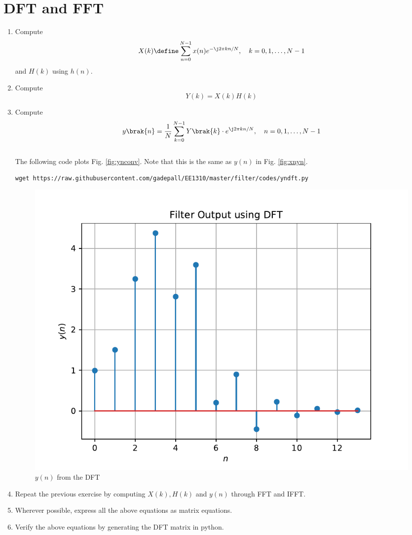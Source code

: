 \documentclass[journal,12pt,twocolumn]{IEEEtran}
\renewcommand\thesection{\arabic{section}}
\begin{document}
\section{DFT and FFT}
\begin{enumerate}[label=\thesection.\arabic*]
\item
Compute
\begin{equation}
X(k) \define \sum _{n=0}^{N-1}x(n) e^{-\j2\pi kn/N}, \quad k = 0,1,\dots, N-1
\end{equation}
and $H(k)$ using $h(n)$.
\item Compute 
\begin{equation}
Y(k) = X(k)H(k)
\end{equation}
\item Compute
\begin{equation}
 y\brak{n}={\frac {1}{N}}\sum _{k=0}^{N-1}Y\brak{k}\cdot e^{\j 2\pi kn/N},\quad n = 0,1,\dots, N-1
\end{equation}
\\
\solution The following code plots Fig. \ref{fig:ynconv}. Note that this is the same as 
$y(n)$ in  Fig. 
\ref{fig:xnyn}. 
%
\begin{lstlisting}
wget https://raw.githubusercontent.com/gadepall/EE1310/master/filter/codes/yndft.py
\end{lstlisting}
\begin{figure}[!ht]
\centering
\includegraphics[width=\columnwidth]{./figs/yndft}
\caption{$y(n)$ from the DFT}
\label{fig:yndft}
\end{figure}

\item Repeat the previous exercise by computing $X(k), H(k)$ and $y(n)$ through FFT and 
IFFT.
\item Wherever possible, express all the above equations as matrix equations.
\item Verify the above equations by generating the DFT matrix in python.
\end{enumerate}
%
\end{document}
